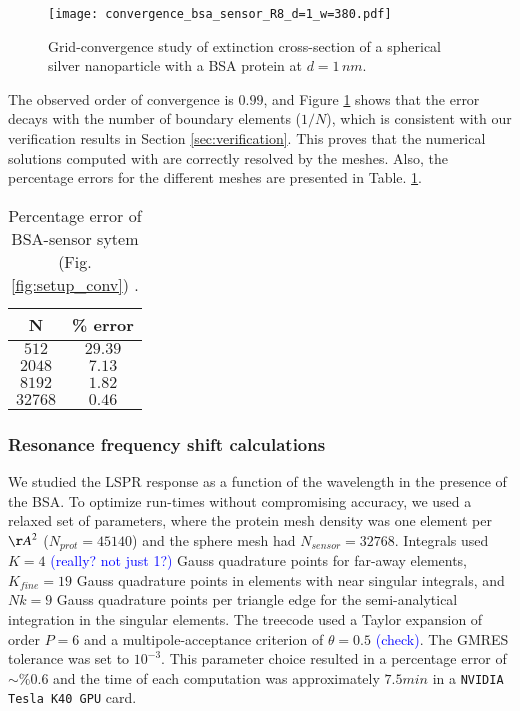 \begin{figure}[h] %
   \centering
   \texttt{[image: convergence\_bsa\_sensor\_R8\_d=1\_w=380.pdf]} 
   \caption{Grid-convergence study of extinction cross-section of a spherical silver
            nanoparticle with a BSA protein at $d=1 \, nm$.}
   \label{fig:error_sphere-bsa}
\end{figure}

The observed order of convergence is $0.99$, and 
Figure \ref{fig:error_sphere-bsa} shows that the error decays with the number
of boundary elements ($1/N$), which is consistent with our verification 
results in Section \ref{sec:verification}. This proves that the
numerical solutions computed with \pygbe are correctly resolved by the meshes.
Also, the percentage errors for the different meshes are presented in Table. \ref{table:err_bsa_sensor}.

\begin{table}[h]
    \centering
    \caption{\label{table:err_bsa_sensor} Percentage error of BSA-sensor sytem (Fig.\ref{fig:setup_conv}) .} 
    \begin{tabular}{c c}
    \hline%
    N & \% error \\
    \hline%
     $512$ & $29.39$ \\
     $2048$ & $7.13$ \\
     $8192$ & $1.82$ \\
     $32768$ & $0.46$ \\
    \hline%
    \end{tabular}
\end{table}

\subsubsection{Resonance frequency shift calculations} \label{sec:bsa_shift}

We studied the LSPR response as a function of the wavelength in the presence 
of the BSA. To optimize run-times without compromising accuracy, we used a relaxed
set of parameters, where the protein mesh density was one element per
${\AA}^2$ ($N_{prot}=45140$) and the sphere mesh had $N_{sensor}=32768$. Integrals used
$K=4$ \textcolor{blue}{(really? not just 1?)} Gauss quadrature points for far-away elements, 
$K_{fine} = 19$ Gauss quadrature points in elements with near singular integrals,
and $Nk = 9$ Gauss quadrature points per triangle edge for the semi-analytical integration in the 
singular elements. The treecode used a Taylor expansion of order $P=6$ and a multipole-acceptance
criterion of $\theta=0.5$ \textcolor{blue}{(check)}. The GMRES tolerance was set to $10^{-3}$. 
This parameter choice resulted in a percentage error of $\sim\%0.6$
and the time of each computation was approximately $7.5 min$ in a \texttt{NVIDIA Tesla K40 GPU}
card. 

